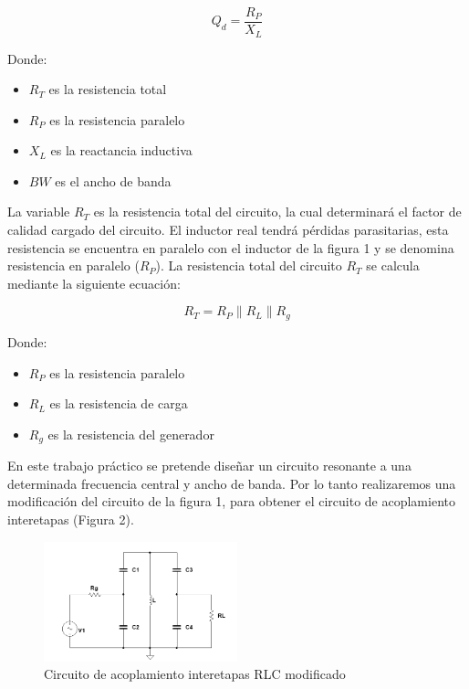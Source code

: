 \begin{equation}
    Q_d = \frac{R_P}{X_L}
\end{equation}

Donde: 

\begin{itemize}
    \item $R_T$ es la resistencia total
    \item $R_P$ es la resistencia paralelo
    \item $X_L$ es la reactancia inductiva
    \item $BW$ es el ancho de banda
\end{itemize}

La variable $R_T$ es la resistencia total del circuito, la cual determinará el factor de calidad cargado del circuito. 
El inductor real tendrá pérdidas parasitarias, esta resistencia se encuentra en paralelo con el inductor
de la figura 1 y se denomina resistencia en paralelo ($R_P$). La resistencia total del circuito $R_T$ se calcula mediante la siguiente ecuación:

\begin{equation}
    R_T = R_P \parallel R_L \parallel R_g
\end{equation}

Donde:
\begin{itemize}
    \item $R_P$ es la resistencia paralelo
    \item $R_L$ es la resistencia de carga
    \item $R_g$ es la resistencia del generador
\end{itemize}

En este trabajo práctico se pretende diseñar un circuito resonante a una determinada frecuencia central y ancho de banda. Por lo tanto realizaremos una 
modificación del circuito de la figura 1, para obtener el circuito de acoplamiento interetapas (Figura 2). 

\begin{figure}[h]
    \centering
    \includegraphics[width=0.5\textwidth]{Imagenes/circuito_acoplamiento2.png}
    \caption{Circuito de acoplamiento interetapas RLC modificado}
\end{figure}

